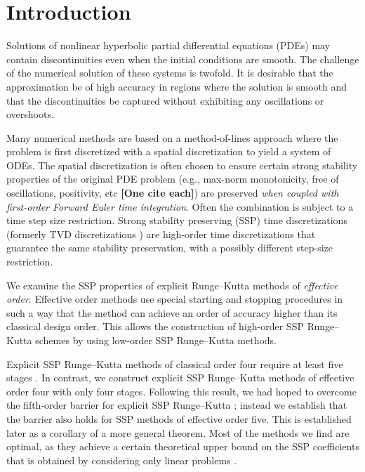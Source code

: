 \section{Introduction}\label{sec:Intro}

Solutions of nonlinear hyperbolic partial differential equations (PDEs) may contain 
discontinuities even when the initial conditions are smooth.
The challenge of the numerical solution of these systems is twofold. 
It is desirable that the approximation be of high accuracy in regions where the solution is 
smooth and that the discontinuities be captured without exhibiting any oscillations or 
overshoots. 

Many numerical methods are based on a method-of-lines approach where the problem is first 
discretized with a spatial discretization to yield a system of ODEs.
The spatial discretization is often chosen to ensure certain strong stability properties of the original PDE problem (e.g., max-norm monotonicity, free of oscillations, positivity, etc {\bf [One cite each]}) are preserved \emph{when coupled with first-order Forward Euler time integration}.
Often the combination is subject to a time step size restriction.
Strong stability preserving (SSP) time discretizations (formerly TVD
discretizations \cite{Gottlieb1998}) are high-order time
discretizations that guarantee the same stability preservation, with a
possibly different step-size restriction.


We examine the SSP properties of explicit Runge--Kutta methods of
\emph{effective order}.
Effective order methods use special starting and stopping procedures
in such a way that the method can achieve an order of
accuracy higher than its classical design order.
This allows the construction of high-order SSP Runge--Kutta schemes by
using low-order SSP Runge--Kutta methods.


Explicit SSP Runge--Kutta methods of classical order four require at least five
stages \cite{Gottlieb1998}.  In contrast, we construct explicit SSP Runge--Kutta methods
of effective order four with only four stages.
Following this result, we had hoped to overcome the fifth-order
barrier for explicit SSP Runge--Kutta \cite{Ruuth2002}; instead we
establish that the barrier also holds for SSP methods of effective
order five.
This is established later as a corollary of a more general theorem.
Most of the methods we find are optimal, as they achieve a certain theoretical
upper bound on the SSP coefficients that is obtained by considering only
linear problems \cite{Kraaijevanger1986}.

